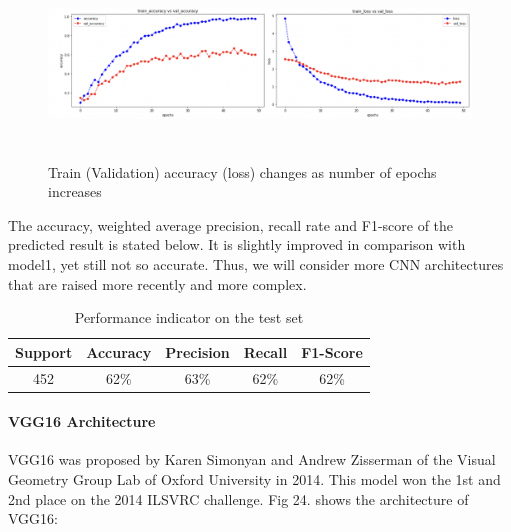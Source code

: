 \begin{figure}[H]
    \centering\includegraphics[width=16cm, height=5cm]{./figures/Alexnet2.jpg}
    \caption{Train (Validation) accuracy (loss) changes as number of epochs increases}
    \label{pic:loss-Alexnet}
\end{figure}

The accuracy, weighted average precision, recall rate and F1-score of the predicted result is stated below. It is slightly improved in comparison with model1, yet still not so accurate. Thus, we will consider more CNN architectures that are raised more recently and more complex.



\begin{table}[!htbp]
    \small
	\centering
	\begin{tabularx}{0.6\textwidth}{ccccc}
		\toprule
		\textbf{Support}
       &  \textbf{Accuracy}
        & \textbf{Precision} 
        & \textbf{Recall} 
        & \textbf{F1-Score} \\

        \midrule
        452
        & 62\%
        & 63\%
        & 62\%
        & 62\%\\
		\bottomrule
	\end{tabularx}%
	\label{tab:result6}%
	\caption{Performance indicator on the test set}
\end{table}%



\paragraph{VGG16 Architecture}

 VGG16\cite{simonyan2014very} was proposed by Karen Simonyan and Andrew Zisserman of the Visual Geometry Group Lab of Oxford University in 2014. This model won the 1st  and 2nd place on the 2014 ILSVRC challenge. Fig 24. shows the architecture of VGG16:
 
